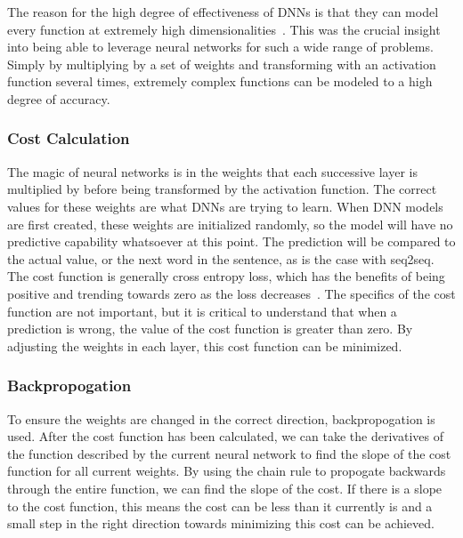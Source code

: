 The reason for the high degree of effectiveness of DNNs is that they can model every function at extremely high dimensionalities~\cite{Nielsen2017}. This was the crucial insight into being able to leverage neural networks for such a wide range of problems. Simply by multiplying by a set of weights and transforming with an activation function several times, extremely complex functions can be modeled to a high degree of accuracy.

\subsubsection{Cost Calculation}
The magic of neural networks is in the weights that each successive layer is multiplied by before being transformed by the activation function. The correct values for these weights are what DNNs are trying to learn.  When DNN models are first created, these weights are initialized randomly, so the model will have no predictive capability whatsoever at this point. The prediction will be compared to the actual value, or the next word in the sentence, as is the case with seq2seq. The cost function is generally cross entropy loss, which has the benefits of being positive and trending towards zero as the loss decreases~\cite{Nielsen2017}. The specifics of the cost function are not important, but it is critical to understand that when a prediction is wrong, the value of the cost function is greater than zero. By adjusting the weights in each layer, this cost function can be minimized.

\subsubsection{Backpropogation}
To ensure the weights are changed in the correct direction, backpropogation is used. After the cost function has been calculated, we can take the derivatives of the function described by the current neural network to find the slope of the cost function for all current weights. By using the chain rule to propogate backwards through the entire function, we can find the slope of the cost. If there is a slope to the cost function, this means the cost can be less than it currently is and a small step in the right direction towards minimizing this cost can be achieved.

